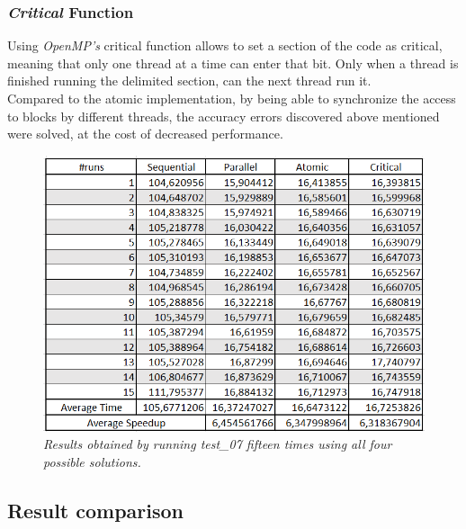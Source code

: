\documentclass[10pt,journal,compsoc]{IEEEtran}
\begin{document}
\subsubsection{{\itshape Critical} Function}
Using {\itshape OpenMP's} critical function allows to set a section of the code as critical, meaning that only one thread at a time can enter that bit. Only when a thread is finished running the delimited section, can the next thread run it.\cite{OpenFull}
\\Compared to the atomic implementation, by being able to synchronize the access to blocks by different threads, the accuracy errors discovered above mentioned were solved, at the cost of decreased performance.

\begin{figure}
    \centering
    \includegraphics[scale=0.35]{test7_results.png}
    \caption{\itshape{ Results obtained by running test\_07 fifteen times using all four possible solutions.}}
    \label{fig:my_label}
\end{figure}

\subsection{Result comparison}
\end{document}

